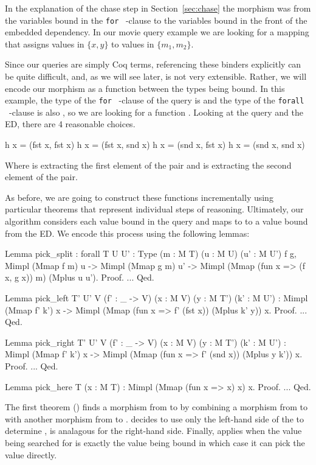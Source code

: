 \documentclass[preprint]{sigplanconf}
\newcommand{\FOR}{{\tt for} \ }
\newcommand{\FORALL}{{\tt forall} \ }
\begin{document}
In the explanation of the chase step in Section~\ref{sec:chase} the morphism was from the variables bound in the \FOR-clause to the variables bound in the front of the embedded dependency.
In our movie query example we are looking for a mapping that assigns values in $\{x,y\}$ to values in $\{m_1,m_2\}$.

Since our queries are simply Coq terms, referencing these binders explicitly can be quite difficult, and, as we will see later, is not very extensible.
Rather, we will encode our morphism as a function between the types being bound.
In this example, the type of the \FOR-clause of the query is  and the type of the \FORALL-clause is also , so we are looking for a function .
Looking at the query and the ED, there are 4 reasonable choices.
\begin{coq}
h x = (fst x, fst x)
h x = (fst x, snd x)
h x = (snd x, fst x)
h x = (snd x, snd x)
\end{coq}
Where  is extracting the first element of the pair and  is extracting the second element of the pair.

As before, we are going to construct these functions incrementally using particular theorems that represent individual steps of reasoning.
Ultimately, our algorithm considers each value bound in the query and maps to to a value bound from the ED.
We encode this process using the following lemmas:
\begin{coq}
Lemma pick_split
: forall {T U U' : Type} (m : M T) (u : M U) (u' : M U') f g,
  Mimpl (Mmap f m) u ->
  Mimpl (Mmap g m) u' ->
  Mimpl (Mmap (fun x => (f x, g x)) m) (Mplus u u').
Proof. ... Qed.

Lemma pick_left {T' U' V} (f' : _ -> V) (x : M V) (y : M T') (k' : M U')
: Mimpl (Mmap f' k') x ->
  Mimpl (Mmap (fun x => f' (fst x)) (Mplus k' y)) x.
Proof. ... Qed.

Lemma pick_right {T' U' V} (f' : _ -> V) (x : M V) (y : M T') (k' : M U')
: Mimpl (Mmap f' k') x ->
  Mimpl (Mmap (fun x => f' (snd x)) (Mplus y k')) x.
Proof. ... Qed.

Lemma pick_here {T} (x : M T)
: Mimpl (Mmap (fun x => x) x) x.
Proof. ... Qed.
\end{coq}
The first theorem () finds a morphism from  to  by combining a morphism from  to  with another morphism from  to .
 decides to use only the left-hand side of the  to determine ,  is analagous for the right-hand side.
Finally,  applies when the value being searched for is exactly the value being bound in which case it can pick the value directly.
\end{document}
